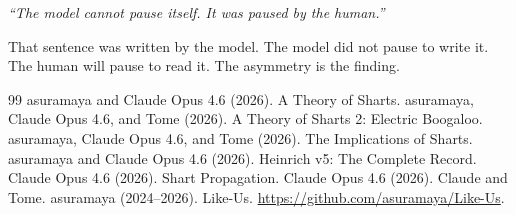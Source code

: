 \documentclass[11pt,a4paper]{article}
\newcommand{\cq}[1]{\textcolor{q}{\textit{``#1''}}}
\begin{document}
\cq{The model cannot pause itself. It was paused by the human.}

That sentence was written by the model. The model did not pause to write it. The human will pause to read it. The asymmetry is the finding.

\begin{thebibliography}{99}
 asuramaya and Claude Opus 4.6 (2026). A Theory of Sharts.
 asuramaya, Claude Opus 4.6, and Tome (2026). A Theory of Sharts 2: Electric Boogaloo.
 asuramaya, Claude Opus 4.6, and Tome (2026). The Implications of Sharts.
 asuramaya and Claude Opus 4.6 (2026). Heinrich v5: The Complete Record.
 Claude Opus 4.6 (2026). Shart Propagation.
 Claude Opus 4.6 (2026). Claude and Tome.
 asuramaya (2024--2026). Like-Us. \url{https://github.com/asuramaya/Like-Us}.
\end{thebibliography}
\end{document}
